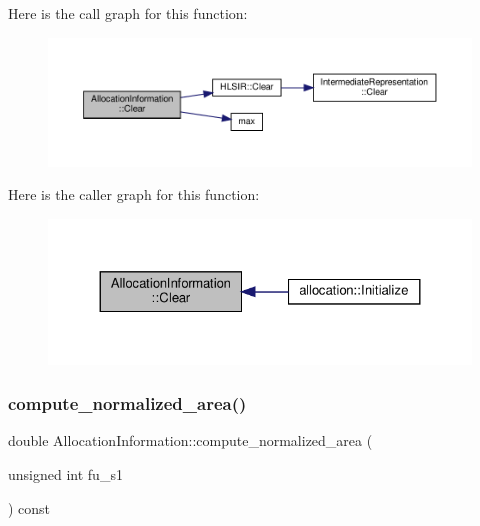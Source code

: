 Here is the call graph for this function\+:
\nopagebreak
\begin{figure}[H]
\begin{center}
\leavevmode
\includegraphics[width=350pt]{d7/d79/classAllocationInformation_a2a8dda2a075950424083d9aff01267fe_cgraph}
\end{center}
\end{figure}
Here is the caller graph for this function\+:
\nopagebreak
\begin{figure}[H]
\begin{center}
\leavevmode
\includegraphics[width=324pt]{d7/d79/classAllocationInformation_a2a8dda2a075950424083d9aff01267fe_icgraph}
\end{center}
\end{figure}
\mbox{\label{classAllocationInformation_a5d67bf413b140779cce7e5d1121db521}} 
\subsubsection{\texorpdfstring{compute\+\_\+normalized\+\_\+area()}{compute\_normalized\_area()}}
{\footnotesize\ttfamily double Allocation\+Information\+::compute\+\_\+normalized\+\_\+area (\begin{DoxyParamCaption}\item[{unsigned int}]{fu\+\_\+s1 }\end{DoxyParamCaption}) const}



